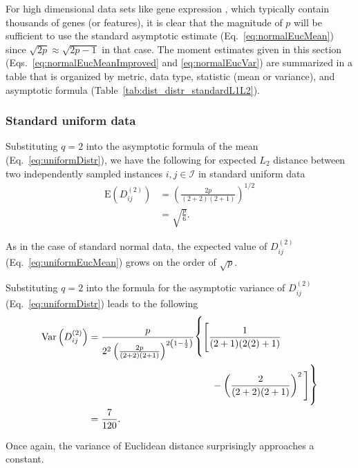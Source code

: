 \documentclass[aoas]{imsart}
\begin{document}
For high dimensional data sets like gene expression \cite{brazma2000,wang2018}, which typically contain thousands of genes (or features), it is clear that the magnitude of $p$ will be sufficient to use the standard asymptotic estimate (Eq.~\ref{eq:normalEucMean}) since $\sqrt{2p} \approx \sqrt{2p - 1}$ in that case. The moment estimates given in this section (Eqs.~\ref{eq:normalEucMeanImproved} and \ref{eq:normalEucVar}) are summarized in a table that is organized by metric, data type, statistic (mean or variance), and asymptotic formula (Table~\ref{tab:dist_distr_standardL1L2}).

\subsubsection{Standard uniform data}

Substituting $q=2$ into the asymptotic formula of the mean (Eq.~\ref{eq:uniformDistr}), we have the following for expected $L_2$ distance between two independently sampled instances $i,j \in \mathcal{I}$ in standard uniform data
%
\begin{equation}\label{eq:uniformEucMean}
\begin{aligned}
\text{E}\left(D^{(2)}_{ij}\right) &= \left(\frac{2p}{(2+2)(2+1)}\right)^{1/2} \\
&= \sqrt{\frac{p}{6}}.
\end{aligned}
\end{equation}

As in the case of standard normal data, the expected value of $D^{(2)}_{ij}$ (Eq.~\ref{eq:uniformEucMean}) grows on the order of $\sqrt{p}$. 

Substituting $q=2$ into the formula for the asymptotic variance of $D^{(2)}_{ij}$ (Eq.~\ref{eq:uniformDistr}) leads to the following
%
\begin{equation}\label{eq:uniformEucVar}
\begin{aligned}
\text{Var}\left(D^{(2)}_{ij}\right) &= \frac{p}{2^2\left(\frac{2p}{(2 + 2)(2 + 1)}\right)^{2\left(1 - \frac{1}{2}\right)}} {\fontsize{0.5cm}{1pt}\selectfont \Biggl\{}{\Biggl[}\frac{1}{(2 + 1)(2(2) + 1)} \\
&\hspace{4.5cm}- \left(\frac{2}{(2 + 2)(2 + 1)}\right)^2{\Biggr]}{\fontsize{0.5cm}{1pt}\selectfont \Biggr\}} \\
&= \frac{7}{120}.
\end{aligned}
\end{equation}

Once again, the variance of Euclidean distance surprisingly approaches a constant.
\end{document}
